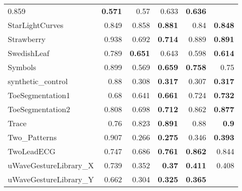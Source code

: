 \begin{longtable}[c]{|l||r||r|r||r|r|}
0.859 &
\cellcolor[rgb]{ .973,  .796,  .678} \textbf{0.571} &
0.57 &
0.633 &
\cellcolor[rgb]{ .973,  .796,  .678} \textbf{0.636}
\\
StarLightCurves &
0.849 &
0.858 &
\cellcolor[rgb]{ .973,  .796,  .678} \textbf{0.881} &
0.84 &
\cellcolor[rgb]{ .973,  .796,  .678} \textbf{0.848}
\\
\rowcolor[rgb]{ .851,  .851,  .851} Strawberry &
0.938 &
0.692 &
\cellcolor[rgb]{ .973,  .796,  .678} \textbf{0.714} &
0.889 &
\cellcolor[rgb]{ .973,  .796,  .678} \textbf{0.891}
\\
SwedishLeaf &
0.789 &
\cellcolor[rgb]{ .973,  .796,  .678} \textbf{0.651} &
0.643 &
0.598 &
\cellcolor[rgb]{ .973,  .796,  .678} \textbf{0.614}
\\
\rowcolor[rgb]{ .851,  .851,  .851} Symbols &
0.899 &
0.569 &
\cellcolor[rgb]{ .973,  .796,  .678} \textbf{0.659} &
\cellcolor[rgb]{ .973,  .796,  .678} \textbf{0.758} &
0.75
\\
synthetic\_control &
0.88 &
0.308 &
\cellcolor[rgb]{ .973,  .796,  .678} \textbf{0.317} &
0.307 &
\cellcolor[rgb]{ .973,  .796,  .678} \textbf{0.317}
\\
\rowcolor[rgb]{ .851,  .851,  .851} ToeSegmentation1 &
0.68 &
0.641 &
\cellcolor[rgb]{ .973,  .796,  .678} \textbf{0.661} &
0.724 &
\cellcolor[rgb]{ .973,  .796,  .678} \textbf{0.732}
\\
ToeSegmentation2 &
0.808 &
0.698 &
\cellcolor[rgb]{ .973,  .796,  .678} \textbf{0.712} &
0.862 &
\cellcolor[rgb]{ .973,  .796,  .678} \textbf{0.877}
\\
\rowcolor[rgb]{ .851,  .851,  .851} Trace &
0.76 &
0.823 &
\cellcolor[rgb]{ .973,  .796,  .678} \textbf{0.891} &
0.88 &
\cellcolor[rgb]{ .973,  .796,  .678} \textbf{0.9}
\\
Two\_Patterns &
0.907 &
0.266 &
\cellcolor[rgb]{ .973,  .796,  .678} \textbf{0.275} &
0.346 &
\cellcolor[rgb]{ .973,  .796,  .678} \textbf{0.393}
\\
\rowcolor[rgb]{ .851,  .851,  .851} TwoLeadECG &
0.747 &
0.686 &
\cellcolor[rgb]{ .973,  .796,  .678} \textbf{0.761} &
\cellcolor[rgb]{ .973,  .796,  .678} \textbf{0.862} &
0.844
\\
uWaveGestureLibrary\_X &
0.739 &
0.352 &
\cellcolor[rgb]{ .973,  .796,  .678} \textbf{0.37} &
\cellcolor[rgb]{ .973,  .796,  .678} \textbf{0.411} &
0.408
\\
\rowcolor[rgb]{ .851,  .851,  .851} uWaveGestureLibrary\_Y &
0.662 &
0.304 &
\cellcolor[rgb]{ .973,  .796,  .678} \textbf{0.325} &
\cellcolor[rgb]{ .973,  .796,  .678} \textbf{0.365} &

\end{longtable}

